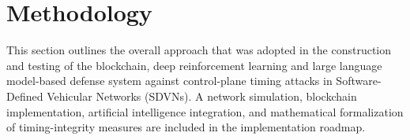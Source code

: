\section{Methodology}

 This section outlines the overall approach that was adopted in the construction and testing of the blockchain, deep reinforcement learning and large language model-based defense system against control-plane timing attacks in Software-Defined Vehicular Networks (SDVNs). A network simulation, blockchain implementation, artificial intelligence integration, and mathematical formalization of timing-integrity measures are included in the implementation roadmap.

